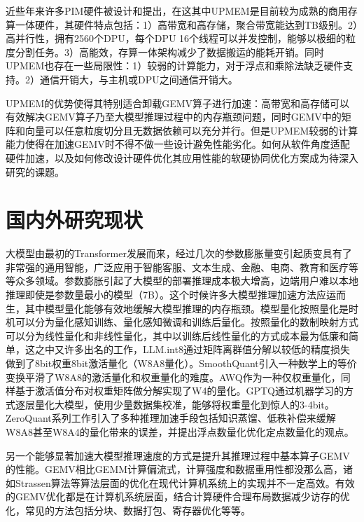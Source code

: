 近些年来许多PIM硬件被设计和提出\cite{SamsungHBMPIM,AxDIMM,AiM,AlibabaPIM,UPMEMHotChips}，在这其中UPMEM是目前较为成熟的商用存算一体硬件，其硬件特点包括：1）高带宽和高存储，聚合带宽能达到TB级别。2）高并行性，拥有2560个DPU，每个DPU 16个线程可以并发控制，能够以极细的粒度分割任务。3）高能效，存算一体架构减少了数据搬运的能耗开销。同时UPMEM也存在一些局限性：1）较弱的计算能力，对于浮点和乘除法缺乏硬件支持。2）通信开销大，与主机或DPU之间通信开销大。

UPMEM的优势使得其特别适合卸载GEMV算子进行加速：高带宽和高存储可以有效解决GEMV算子乃至大模型推理过程中的内存瓶颈问题，同时GEMV中的矩阵和向量可以任意粒度切分且无数据依赖可以充分并行。但是UPMEM较弱的计算能力使得在加速GEMV时不得不做一些设计避免性能劣化。如何从软件角度适配硬件加速，以及如何修改设计硬件优化其应用性能的软硬协同优化方案成为待深入研究的课题。

\section{国内外研究现状}
大模型由最初的Transformer\cite{Transformer}发展而来，经过几次的参数膨胀\cite{GPT-1,GPT-2,GPT-3}量变引起质变具有了非常强的通用智能，广泛应用于智能客服、文本生成、金融、电商、教育和医疗等等众多领域\cite{EdgeLLM}。参数膨胀引起了大模型的部署推理成本极大增高，边端用户难以本地推理即使是参数量最小的模型（7B）。这个时候许多大模型推理加速方法应运而生\cite{LLMInferSurveyTsingHua}，其中模型量化能够有效地缓解大模型推理的内存瓶颈\cite{ModelQuant}。模型量化按照量化是时机可以分为量化感知训练、量化感知微调和训练后量化。按照量化的数制映射方式可以分为线性量化和非线性量化，其中以训练后线性量化的方式成本最为低廉和简单，这之中又许多出名的工作，LLM.int8\cite{LLMINT8}通过矩阵离群值分解以较低的精度损失做到了8bit权重8bit激活量化（W8A8量化）。SmoothQuant\cite{SmoothQuant}引入一种数学上的等价变换平滑了W8A8的激活量化和权重量化的难度。AWQ\cite{AWQ}作为一种仅权重量化，同样基于激活值分布对权重矩阵做分解实现了W4的量化。GPTQ\cite{GPTQ}通过机器学习的方式逐层量化大模型，使用少量数据集校准，能够将权重量化到惊人的3-4bit。ZeroQuant系列\cite{ZeroQuant1,ZeroQuant2,ZeroQuantFP}工作引入了多种推理加速手段包括知识蒸馏、低秩补偿来缓解W8A8甚至W8A4的量化带来的误差，并提出浮点数量化优化定点数量化的观点。

另一个能够显著加速大模型推理速度的方式是提升其推理过程中基本算子GEMV的性能\cite{InferLinear}。GEMV相比GEMM计算偏流式，计算强度和数据重用性都没那么高，诸如Strassen算法\cite{Strassen}等算法层面的优化在现代计算机系统上的实现并不一定高效。有效的GEMV优化都是在计算机系统层面，结合计算硬件合理布局数据减少访存的优化\cite{GPUGEMV}，常见的方法包括分块、数据打包、寄存器优化等等。

